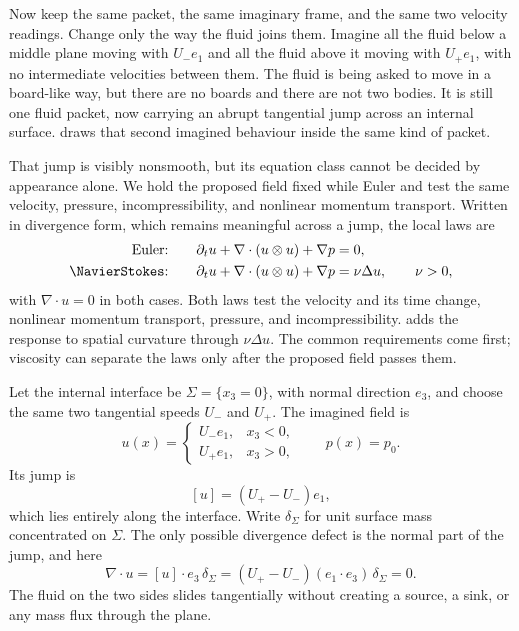 Now keep the same packet, the same imaginary frame, and the same two velocity readings.
Change only the way the fluid joins them.
Imagine all the fluid below a middle plane moving with \(U_-e_1\) and all the fluid above it moving with \(U_+e_1\), with no intermediate velocities between them.
The fluid is being asked to move in a board-like way, but there are no boards and there are not two bodies.
It is still one fluid packet, now carrying an abrupt tangential jump across an internal surface.
 draws that second imagined behaviour inside the same kind of packet.



That jump is visibly nonsmooth, but its equation class cannot be decided by appearance alone.
We hold the proposed field fixed while Euler and \NavierStokes{} test the same velocity, pressure, incompressibility, and nonlinear momentum transport.
Written in divergence form, which remains meaningful across a jump, the local laws are
\[
  \begin{aligned}
  \text{Euler:}\qquad
  &\partial_tu+\nabla\cdot(u\otimes u)+\nabla p=0,\\
  \text{\NavierStokes:}\qquad
  &\partial_tu+\nabla\cdot(u\otimes u)+\nabla p=\nu\Delta u,
  \qquad \nu>0,
  \end{aligned}
\]
with \(\nabla\cdot u=0\) in both cases.
Both laws test the velocity and its time change, nonlinear momentum transport, pressure, and incompressibility.
\NavierStokes{} adds the response to spatial curvature through \(\nu\Delta u\).
The common requirements come first; viscosity can separate the laws only after the proposed field passes them.

Let the internal interface be \(\Sigma=\{x_3=0\}\), with normal direction \(e_3\), and choose the same two tangential speeds \(U_-\) and \(U_+\).
The imagined field is
\[
  u(x)=
  \begin{cases}
    U_-e_1, & x_3<0,\\
    U_+e_1, & x_3>0,
  \end{cases}
  \qquad
  p(x)=p_0.
\]
Its jump is
\[
  [u]=(U_+-U_-)e_1,
\]
which lies entirely along the interface.
Write \(\delta_\Sigma\) for unit surface mass concentrated on \(\Sigma\).
The only possible divergence defect is the normal part of the jump, and here
\[
  \nabla\cdot u
  =
  [u]\cdot e_3\,\delta_\Sigma
  =
  (U_+-U_-)(e_1\cdot e_3)\,\delta_\Sigma
  =0.
\]
The fluid on the two sides slides tangentially without creating a source, a sink, or any mass flux through the plane.

